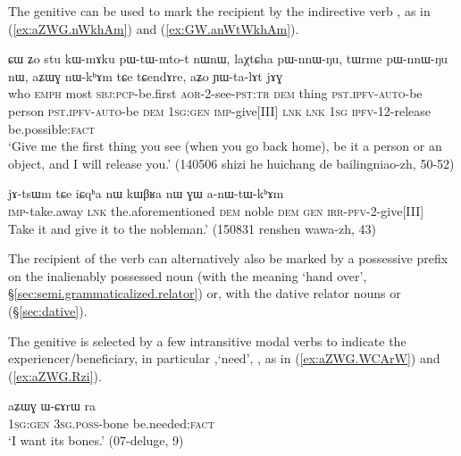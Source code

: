 The genitive can be used to mark the recipient by the indirective verb , as in (\ref{ex:aZWG.nWkhAm}) and (\ref{ex:GW.anWtWkhAm}).   

\begin{exe}
\ex \label{ex:aZWG.nWkhAm}
 \gll ɕɯ ʑo stu kɯ-mɤku pɯ-tɯ-mto-t nɯnɯ, laχtɕha pɯ-nnɯ-ŋu, tɯrme pɯ-nnɯ-ŋu nɯ, aʑɯɣ nɯ-kʰɤm tɕe tɕendɤre, aʑo ɲɯ-ta-lɤt jɤɣ \\
 who \textsc{emph} most \textsc{sbj}:\textsc{pcp}-be.first \textsc{aor}-2-see-\textsc{pst}:\textsc{tr} \textsc{dem}  thing \textsc{pst}.\textsc{ipfv}-\textsc{auto}-be   person \textsc{pst}.\textsc{ipfv}-\textsc{auto}-be \textsc{dem} \textsc{1sg}:\textsc{gen} \textsc{imp}-give[III] \textsc{lnk} \textsc{lnk} \textsc{1sg} \textsc{ipfv}-1\fl{}2-release be.possible:\textsc{fact} \\
 \glt `Give me the first thing you see (when you go back home), be it a person or an object, and I will release you.' (140506 shizi he huichang de bailingniao-zh, 50-52)
\end{exe}

\begin{exe}
\ex \label{ex:GW.anWtWkhAm}
 \gll jɤ-tsɯm tɕe iɕqʰa nɯ kɯβʁa nɯ ɣɯ a-nɯ-tɯ-kʰɤm \\
 \textsc{imp}-take.away \textsc{lnk} the.aforementioned \textsc{dem} noble \textsc{dem} \textsc{gen} \textsc{irr}-\textsc{pfv}-2-give[III] \\
 \glt  Take it and give it to the nobleman.' (150831 renshen wawa-zh, 43)
\end{exe}
 
The recipient of the verb   can alternatively also be marked by a possessive prefix on the inalienably possessed noun  (with the meaning `hand over', §\ref{sec:semi.grammaticalized.relator}) or, with the dative relator nouns  or  (§\ref{sec:dative}).

The genitive is selected by a few intransitive modal verbs to indicate the experiencer/beneficiary, in particular  ,`need', , as in (\ref{ex:aZWG.WCArW}) and (\ref{ex:aZWG.Rzi}).

\begin{exe}
\ex \label{ex:aZWG.WCArW}
 \gll aʑɯɣ ɯ-ɕɤrɯ ra \\
 \textsc{1sg}:\textsc{gen} \textsc{3sg}.\textsc{poss}-bone be.needed:\textsc{fact} \\
\glt `I want its bones.' (07-deluge, 9)
\end{exe}

